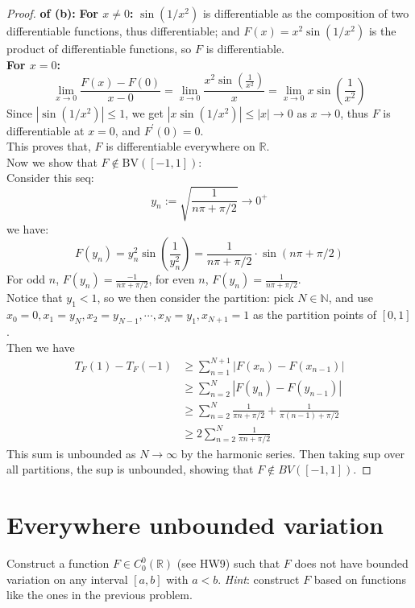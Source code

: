 \documentclass[lang=cn,11pt]{elegantbook}
\begin{document}
\begin{proof}
    \textbf{of (b):}
\textbf{For $x \neq 0$:} $\sin(1/ x^2)$ is differentiable as the composition of two differentiable functions, thus differentiable; and $F(x)=x^2 \sin \left(1 / x^2\right)$ is the product of differentiable functions, so $F$ is differentiable.\\
\textbf{For $x=0$:}$$
\lim _{x \rightarrow 0} \frac{F(x)-F(0)}{x-0}=\lim _{x \rightarrow 0} \frac{x^2 \sin \left(\frac{1}{x^2}\right)}{x}=\lim _{x \rightarrow 0} x \sin \left(\frac{1}{x^2}\right)
$$
Since $\left|\sin \left(1 / x^2\right)\right| \leq 1$, we get $\left|x \sin \left(1 / x^2\right)\right| \leq|x| \rightarrow 0$ as $x \rightarrow 0$, thus $F$ is differentiable at $x=0$, and $ F^{\prime}(0)=0$.\\
This proves that, $F$ is differentiable everywhere on $\mathbb{R}$.\\
Now we show that $F\not\in\mathrm{BV}([-1,1])$:\\
Consider this seq: 
$$
y_n:= \sqrt{\frac{1}{n \pi+\pi / 2}} \rightarrow 0^{+}
$$
we have:
$$
F\left(y_n\right)=y_n^2 \sin \left(\frac{1}{y_n^2}\right)=\frac{1}{n \pi+\pi / 2} \cdot \sin (n \pi+\pi / 2)
$$For odd $n$, $F(y_n) = \frac{-1}{n \pi+\pi / 2}$, for even $n$, $F({y_n}) =  \frac{1}{n \pi+\pi / 2}$.\\
Notice that $y_1 < 1$, so we then consider the partition: pick $N \in \mathbb{N}$, and use $ x_0 = 0,x_1 = y_N,x_2 =y_{N-1},\cdots, x_{N} = y_{1},x_{N+1} = 1$ as the partition points of $[0,1]$.\\
Then we have
\begin{align*}
    T_F(1) - T_F(-1) &\geq  \sum_{n=1}^{N+1} |F (x_n) - F(x_{n-1}) |\\
    &\geq  \sum_{n=2}^{N} |F (y_n) - F(y_{n-1}) | \\
    &\geq  \sum_{n=2}^{N}  \frac{1}{\pi n+\pi / 2} + \frac{1}{\pi (n-1)+\pi / 2} \\
    &\geq 2\sum_{n=2}^{N} \frac{1}{\pi n+\pi / 2}
\end{align*}
This sum is unbounded as $N \to \infty$ by the harmonic series. Then taking sup over all partitions, the sup is unbounded, showing that $F \not \in BV([-1,1])$.
\end{proof}




\section{Everywhere unbounded variation}
  Construct a function $F\in C^0_0(\mathbb{R})$ (see HW9) such that $F$ does not have bounded variation on any interval $[a,b]$ with $a<b$.
  \textit{Hint}: construct $F$ based on functions like the ones in the previous problem.
\end{document}

